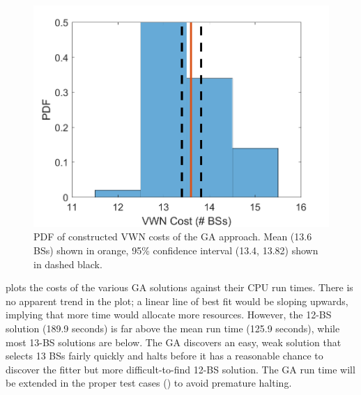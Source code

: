\documentclass[12pt,dvipsnames]{report}
\begin{document}
\begin{figure}[tp]
	\centering
	\includegraphics[height=0.4\textheight]{Figures/Prelim_GACostsPDF}
	\caption[GA approach VWN cost trend for preliminary simulations]{PDF of constructed VWN costs of the GA approach.  Mean (13.6 BSs) shown in orange, 95\% confidence interval (13.4, 13.82) shown in dashed black.}
	\label{fig:Prelim_GACostsPDF}
\end{figure}

 plots the costs of the various GA solutions against their CPU run times.  There is no apparent trend in the plot; a linear line of best fit would be sloping upwards, implying that more time would allocate more resources.  However, the 12-BS solution (189.9 seconds) is far above the mean run time (125.9 seconds), while most 13-BS solutions are below.  The GA discovers an easy, weak solution that selects 13 BSs fairly quickly and halts before it has a reasonable chance to discover the fitter but more difficult-to-find 12-BS solution.  The GA run time will be extended in the proper test cases () to avoid premature halting.
\end{document}
